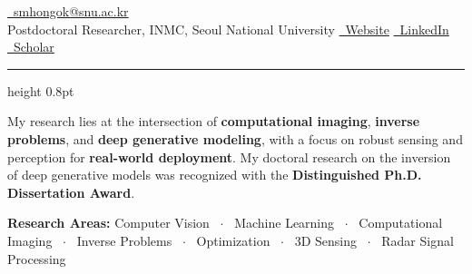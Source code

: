 



\noindent
{} \hfill \href{mailto:smhongok@snu.ac.kr}{\faEnvelope \ smhongok@snu.ac.kr} \\
{\large Postdoctoral Researcher, INMC, Seoul National University} \hfill \href{https://smhongok.github.io}{\faGlobe \ Website} \quad \href{https://linkedin.com/in/sm-hong}{\faLinkedin \ LinkedIn} \quad \href{https://scholar.google.com/citations?user=YOUR_ID}{\faGraduationCap \ Scholar}

\vspace{0.5ex}
\hrule height 0.8pt
\vspace{1ex}

\noindent
My research lies at the intersection of \textbf{computational imaging}, \textbf{inverse problems}, and \textbf{deep generative modeling}, with a focus on robust sensing and perception for \textbf{real-world deployment}.
My doctoral research on the inversion of deep generative models was recognized with the \textbf{Distinguished Ph.D. Dissertation Award}.

\vspace{2pt}

\noindent\textbf{Research Areas:}
Computer Vision \ $\cdot$ \ Machine Learning \ $\cdot$ \ Computational Imaging \ $\cdot$ \ Inverse Problems \ $\cdot$ \ Optimization \ $\cdot$ \ 3D Sensing \ $\cdot$ \ Radar Signal Processing

\vspace{2pt}




